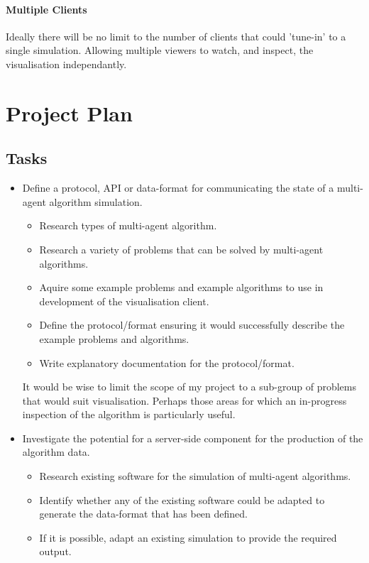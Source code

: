 \documentclass[a4paper]{article}
\begin{document}
		\paragraph{Multiple Clients} Ideally there will be no limit to the number of clients that could 'tune-in' to a single simulation. Allowing multiple viewers to watch, and inspect, the visualisation independantly.

	\section{Project Plan}

		\subsection{Tasks}

			\begin{itemize}

				\item Define a protocol, \textsc{API} or data-format for communicating the state of a multi-agent algorithm simulation.

					\begin{itemize}

						\item Research types of multi-agent algorithm.
						\item Research a variety of problems that can be solved by multi-agent algorithms.
						\item Aquire some example problems and example algorithms to use in development of the visualisation client.
						\item Define the protocol/format ensuring it would successfully describe the example problems and algorithms.
						\item Write explanatory documentation for the protocol/format.

					\end{itemize}

					It would be wise to limit the scope of my project to a sub-group of problems that would suit visualisation. Perhaps those areas for which an in-progress inspection of the algorithm is particularly useful.

				\item Investigate the potential for a server-side component for the production of the algorithm data.

					\begin{itemize}

						\item Research existing software for the simulation of multi-agent algorithms.
						\item Identify whether any of the existing software could be adapted to generate the data-format that has been defined.
						\item If it is possible, adapt an existing simulation to provide the required output.


\end{itemize}
\end{itemize}
\end{document}
